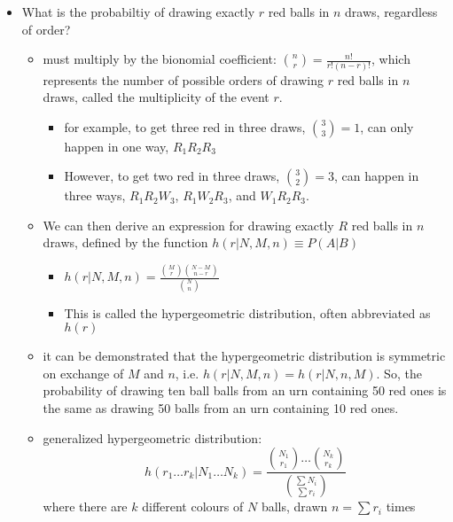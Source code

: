 \documentclass[../jaynes_prob_theory_notes.tex]{subfiles}
\begin{document}
\begin{itemize}
            \item What is the probabiltiy of drawing exactly $r$ red balls in $n$ draws, regardless of order?
                \begin{itemize}
                    \item must multiply by the bionomial coefficient: $\binom{n}{r} = \frac{n!}{r!(n-r)!}$, which represents the number of possible orders of drawing $r$ red balls in $n$ draws, called the multiplicity of the event $r$.
                        \begin{itemize}
                            \item for example, to get three red in three draws, $\binom{3}{3} = 1$, can only happen in one way, $R_1R_2R_3$
                            \item However, to get two red in three draws, $\binom{3}{2} = 3$, can happen in three ways, $R_1R_2W_3$, $R_1W_2R_3$, and $W_1R_2R_3$.
                        \end{itemize}
                    \item We can then derive an expression for drawing exactly $R$ red balls in $n$ draws, defined by the function $h(r|N, M, n) \equiv P(A|B)$
                        \begin{itemize}
                            \item[] $h(r|N, M, n) = \frac{\binom{M}{r}\binom{N-M}{n-r}}{\binom{N}{n}}$
                            \item This is called the hypergeometric distribution, often abbreviated as $h(r)$
                        \end{itemize}
                    \item it can be demonstrated that the hypergeometric distribution is symmetric on exchange of $M$ and $n$, i.e. $h(r|N, M, n) = h(r|N, n, M)$. So, the probability of drawing ten ball balls from an urn containing 50 red ones is the same as drawing 50 balls from an urn containing 10 red ones.
                    \item generalized hypergeometric distribution: 
                        \begin{equation*}
                        h(r_1\ldots r_k|N_1\ldots N_k) = \frac{\binom{N_1}{r_1} \ldots \binom{N_k}{r_k}}{\binom{\sum N_i}{\sum r_i}}
                        \end{equation*}
                        where there are $k$ different colours of $N$ balls, drawn $n = \sum r_i$ times
                \end{itemize}

\end{itemize}
\end{document}
